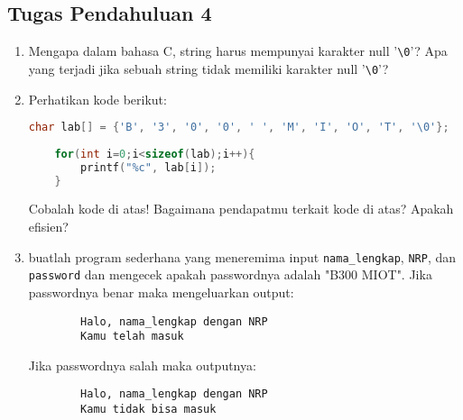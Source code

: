 \subsection*{Tugas Pendahuluan 4}
\begin{enumerate}
	\item Mengapa dalam bahasa C, string harus mempunyai karakter null '\verb|\0|'? Apa yang terjadi jika sebuah string tidak memiliki karakter null '\verb|\0|'?
	\item Perhatikan kode berikut:
	\begin{lstlisting}[language=c]
	char lab[] = {'B', '3', '0', '0', ' ', 'M', 'I', 'O', 'T', '\0'};
	
	for(int i=0;i<sizeof(lab);i++){
		printf("%c", lab[i]);
	}	
\end{lstlisting}
Cobalah kode di atas! Bagaimana pendapatmu terkait kode di atas? Apakah efisien?
	\item buatlah program sederhana yang meneremima input \verb|nama_lengkap|, \verb|NRP|, dan \verb|password| dan mengecek apakah passwordnya adalah "B300 MIOT".
	Jika passwordnya benar maka mengeluarkan output:
	\begin{verbatim}
		Halo, nama_lengkap dengan NRP
		Kamu telah masuk
	\end{verbatim}
	Jika passwordnya salah maka outputnya:
	\begin{verbatim}
		Halo, nama_lengkap dengan NRP
		Kamu tidak bisa masuk
	\end{verbatim}
\end{enumerate}